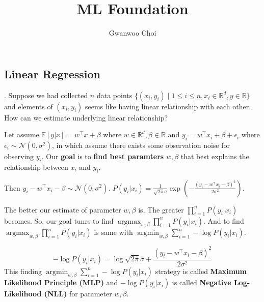\documentclass[8pt]{beamer}
\title{ML Foundation}
\author{Gwanwoo Choi}
\newcommand{\mbb}[1]{\mathbb{#1}}
\newcommand{\tb}[1]{\textbf{#1}}
\newcommand{\argmax}[1]{\operatorname{arg max}_{#1}}
\newcommand{\argmin}[1]{\operatorname{arg min}_{#1}}
\begin{document}
\begin{frame}
    \titlepage
\end{frame}

\subsection{Linear Regression}


\begin{frame}{.}
  Suppose we had collected $n$ data points $\{(x_i, y_i) \mid 1\leq i \leq n, x_i \in \mbb{R}^d, y\in \mbb{R}\}$ and elements of $(x_i, y_i)$ seems like having linear relationship with each other. How can we estimate underlying linear relationship?

  \bigskip

  Let assume $\mbb{E}[y|x] = w^\top x + \beta$ where $w \in \mbb{R}^{d}, \beta \in \mbb{R}$ and $y_i = w^\top x_i + \beta + \epsilon_i$ where $\epsilon_i \sim \mathcal{N}(0, \sigma^2)$, in which assume there exists some observation noise for observing $y_i$. Our \tb{goal} is to \tb{find best paramters} $w, \beta$ that best explains the relationship between $x_i$ and $y_i$.

  Then $y_i - w^\top x_i - \beta \sim \mathcal{N}(0, \sigma^2)$. $P(y_i|x_i) = \frac{1}{\sqrt{2\pi}\sigma} \exp{\left(-\frac{(y_i - w^\top x_i - \beta)^2}{2 \sigma^2}\right)}$.

  The better our estimate of parameter $w, \beta$ is, The greater $\prod_{i=1}^{n} P(y_i|x_i)$ becomes. So, our goal tunrs to find $\argmax{w, \beta} \prod_{i=1}^n P(y_i|x_i)$.
  And to find $\argmax{w, \beta} \prod_{i=1}^n P(y_i|x_i)$ is same with $\argmin{w, \beta} \sum_{i=1}^n -\log{P(y_i|x_i)}$.

  \[
    -\log{P(y_i|x_i)} = \log{\sqrt{2\pi}\sigma} + \frac{(y_i - w^\top x_i - \beta)^2}{2\sigma^2}
  \]
  This finding $\argmin{w, \beta} \sum_{i=1}^n - \log{P(y_i|x_i)}$ strategy is called \tb{Maximum Likelihood Principle (MLP)} and $-\log{P(y_i|x_i)}$ is called \tb{Negative Log-Likelihood (NLL)} for parameter $w, \beta$.
\end{frame}
\end{document}
